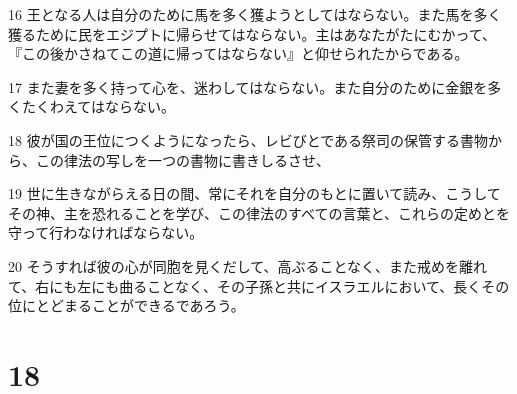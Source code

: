 \par 16 王となる人は自分のために馬を多く獲ようとしてはならない。また馬を多く獲るために民をエジプトに帰らせてはならない。主はあなたがたにむかって、『この後かさねてこの道に帰ってはならない』と仰せられたからである。
\par 17 また妻を多く持って心を、迷わしてはならない。また自分のために金銀を多くたくわえてはならない。
\par 18 彼が国の王位につくようになったら、レビびとである祭司の保管する書物から、この律法の写しを一つの書物に書きしるさせ、
\par 19 世に生きながらえる日の間、常にそれを自分のもとに置いて読み、こうしてその神、主を恐れることを学び、この律法のすべての言葉と、これらの定めとを守って行わなければならない。
\par 20 そうすれば彼の心が同胞を見くだして、高ぶることなく、また戒めを離れて、右にも左にも曲ることなく、その子孫と共にイスラエルにおいて、長くその位にとどまることができるであろう。

\chapter{18}

